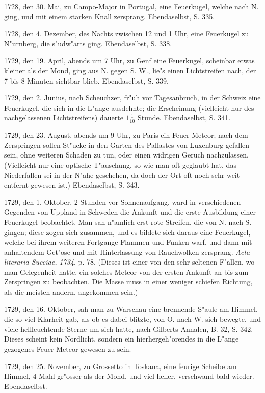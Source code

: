 \documentclass[a4paper, 11pt, oneside, polutonikogreek, german]{article}
\begin{document}
1728, den 30. Mai, zu Campo-Major in Portugal, eine Feuerkugel, welche nach N. ging, und mit einem starken Knall zersprang. Ebendaselbst, S. 335.

1728, den 4. Dezember, des Nachts zwischen 12 und 1 Uhr, eine Feuerkugel zu N"urnberg, die s"udw"arts ging. Ebendaselbst, S. 338.

1729, den 19. April, abends um 7 Uhr, zu Genf eine Feuerkugel, scheinbar etwas kleiner als der Mond, ging aus N. gegen S. W., lie"s einen Lichtstreifen nach, der 7 bis 8 Minuten sichtbar blieb. Ebendaselbst, S. 339.

1729, den 2. Junius, nach Scheuchzer, fr"uh vor Tagesanbruch, in der Schweiz eine Feuerkugel, die sich in die L"ange ausdehnte; die Erscheinung (vielleicht nur des nachgelassenen Lichtstreifens) dauerte $\mathfrak{1\frac{1}{10}}$ Stunde. Ebendaselbst, S. 341.

1729, den 23. August, abends um 9 Uhr, zu Paris ein Feuer-Meteor; nach dem Zerspringen sollen St"ucke in den Garten des Pallastes von Luxenburg gefallen sein, ohne weiteren Schaden zu tun, oder einen widrigen Geruch nachzulassen. (Vielleicht nur eine optische T"auschung, so wie man oft geglaubt hat, das Niederfallen sei in der N"ahe geschehen, da doch der Ort oft noch sehr weit entfernt gewesen ist.) Ebendaselbst, S. 343.

1729, den 1. Oktober, 2 Stunden vor Sonnenaufgang, ward in verschiedenen Gegenden von Uppland in Schweden die Ankunft und die erste Ausbildung einer Feuerkugel beobachtet. Man sah n"amlich erst rote Streifen, die von N. nach S. gingen; diese zogen sich zusammen, und es bildete sich daraus eine Feuerkugel, welche bei ihrem weiteren Fortgange Flammen und Funken warf, und dann mit anhaltendem Get"ose und mit Hinterlassung von Rauchwolken zersprang. \emph{Acta literaria Sueciae, 1734}, p. 78. (Dieses ist einer von den sehr seltenen F"allen, wo man Gelegenheit hatte, ein solches Meteor von der ersten Ankunft an bis zum Zerspringen zu beobachten. Die Masse muss in einer weniger schiefen Richtung, als die meisten andern, angekommen sein.)

1729, den 16. Oktober, sah man zu Warschau eine brennende S"aule am Himmel, die so viel Klarheit gab, als ob es dabei blitzte, von O. nach W. sich bewegte, und viele hellleuchtende Sterne um sich hatte, nach Gilberts Annalen, B. 32, S. 342. Dieses scheint kein Nordlicht, sondern ein hierhergeh"orendes in die L"ange gezogenes Feuer-Meteor gewesen zu sein.

1729, den 25. November, zu Grossetto in Toskana, eine feurige Scheibe am Himmel, 4 Mahl gr"osser als der Mond, und viel heller, verschwand bald wieder. Ebendaselbst.
\end{document}
